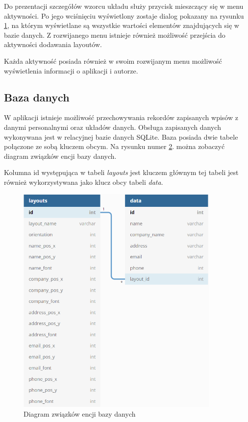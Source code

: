 \documentclass[a4paper,12pt, twoside]{article}
\begin{document}
\begin{enumerate}
\begin{figure}[H]
\begin{minipage}{.5\textwidth}
                    \label{fig:layoutlistDialog}
                \end{minipage}%
    	   \end{figure}
           Do prezentacji szczegółów wzorcu układu służy przycisk mieszczący się w menu aktywności. Po jego wciśnięciu wyświetlony zostaje dialog pokazany na rysunku \ref{fig:layoutlistDialog}, na którym wyświetlane są wszystkie wartości elementów znajdujących się w bazie danych. Z rozwijanego menu istnieje również możliwość przejścia do aktywności dodawania layoutów.
           
    	\end{enumerate}
    	
    	Każda aktywność posiada również w swoim rozwijanym menu możliwość wyświetlenia informacji o aplikacji i autorze.
 
        \subsection{Baza danych}
        W aplikacji istnieje możliwość przechowywania rekordów zapisanych wpisów z danymi personalnymi oraz układów danych. Obsługa zapisanych danych wykonywana jest w relacyjnej bazie danych SQLite. Baza posiada dwie tabele połączone ze sobą kluczem obcym. Na rysunku numer \ref{fig:database}. można zobaczyć diagram związków encji bazy danych. 
        
        Kolumna id występująca w tabeli \textit{layouts} jest kluczem głównym tej tabeli jest również wykorzystywana jako klucz obcy tabeli \textit{data}. 
        
        \begin{figure}[H]
    	        \centering
    			\includegraphics[width=10cm]{images/rys_11baza.png}
    			\caption{Diagram związków encji bazy danych}
                \label{fig:database}
    	\end{figure}
    	
\end{document}
